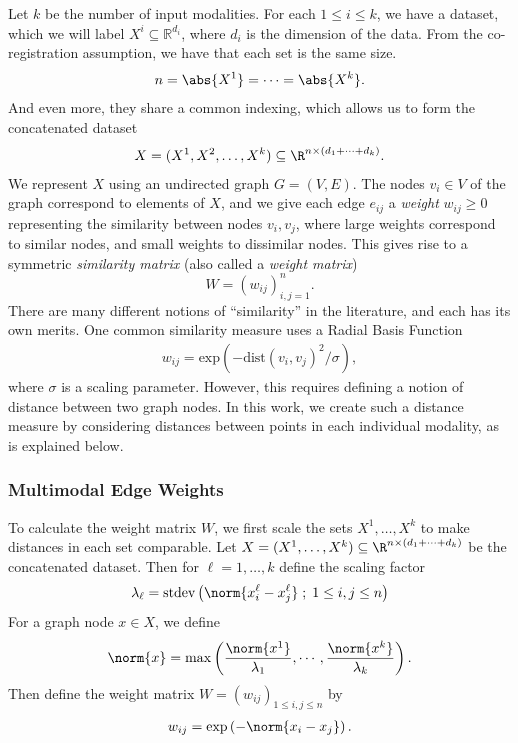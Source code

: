 \documentclass[journal]{IEEEtran}
\begin{document}
Let $k$ be the number of input modalities. For each $1\leq i \leq k$, we have a
dataset, which we will label $X^i \subseteq \mathbb{R}^{d_i}$, where $d_i$ is
the dimension of the data. From the co-registration assumption, we have that
each set is the same size.
\begin{align}
  n = \abs{X^1} = \cdots = \abs{X^k}.
\end{align}
And even more, they share a common indexing, which allows us to form the
concatenated dataset
\begin{align}
  X = (X^1,X^2,\ldots,X^k)\subseteq \R^{n\times (d_1+\cdots+d_k)}.
\end{align}
We represent $X$ using an undirected graph $G = (V,E)$. The nodes $v_i\in V$ of
the graph correspond to elements of $X$, and we give each edge $e_{ij}$ a
\emph{weight} $w_{ij}\geq 0$ representing the similarity between nodes
$v_i, v_j$, where large weights correspond to similar nodes, and small weights
to dissimilar nodes. This gives rise to a symmetric \emph{similarity matrix}
(also called a \emph{weight matrix})
\[W = \left(w_{ij}\right)_{i,j=1}^n.\] There are many different notions of
``similarity'' in the literature, and each has its own merits. One common
similarity measure uses a Radial Basis Function
\begin{align}
  w_{ij} = \text{exp}\left(-\text{dist}\left(v_i,v_j\right)^2 / \sigma \right),
\end{align}
where $\sigma$ is a scaling parameter. However, this requires defining a notion
of distance between two graph nodes. In this work, we create such a distance
measure by considering distances between points in each individual modality, as
is explained below.

\subsubsection{Multimodal Edge Weights} \label{sec:Weights}

To calculate the weight matrix $W$, we first scale the sets $X^1, \ldots, X^k$
to make distances in each set comparable. Let
$X = (X^1, \ldots, X^k) \subseteq \R^{n\times (d_1+\cdots+d_k)}$ be the
concatenated dataset. Then for $\ell = 1,\ldots,k$ define the scaling factor
\begin{align}
  \lambda_\ell = \text{stdev}\left(\norm{x_i^\ell-x_j^\ell}\; ;\;1\leq i,j \leq n\right)
\end{align}
For a graph node $x\in X$, we define
\begin{align} \label{eqn:MultimodalEdgeWeights}
  \norm{x} = \max\left( \frac{\norm{x^1}}{\lambda_1},\cdots,
  \frac{\norm{x^k}}{\lambda_k}\right).
\end{align}
Then define the weight matrix $W = \left(w_{ij}\right)_{1\leq i,j \leq n}$ by
\begin{align}
  w_{ij} = \text{exp}\left(-\norm{x_i - x_j}\right).
\end{align}
\end{document}
